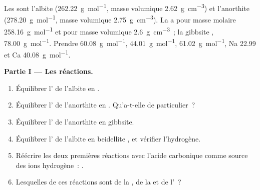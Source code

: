 \begin{problem}
\label{pb:b1:weathering-clays:1}
Les  sont l'albite  (\qty{262.22}{g.mol^{-1}}, masse volumique
\qty{2.62}{g.cm^{-3}}) et l'anorthite 
(\qty{278.20}{g.mol^{-1}}, masse volumique \qty{2.75}{g.cm^{-3}}). La 
 a pour masse molaire \qty{258.16}{g.mol^{-1}} et pour masse volumique
\qty{2.6}{g.cm^{-3}}~; la gibbsite , \qty{78.00}{g.mol^{-1}}. Prendre
 \qty{60.08}{g.mol^{-1}},  \qty{44.01}{g.mol^{-1}}, 
\qty{61.02}{g.mol^{-1}}, Na \num{22.99} et Ca \qty{40.08}{g.mol^{-1}}.

\medskip
\noindent\textbf{Partie I --- Les réactions.}
\begin{enumerate}
  \item Équilibrer l' de l'albite en .
  \item Équilibrer l' de l'anorthite en . Qu'a-t-elle de
        particulier~?
  \item Équilibrer l' de l'anorthite en gibbsite.
  \item Équilibrer l' de l'albite en beidellite
        , et vérifier l'hydrogène.
  \item Réécrire les deux premières réactions avec l'acide carbonique comme source
        des ions hydrogène~: .
  \item Lesquelles de ces réactions sont de la , de la  et
        de l'~?
\end{enumerate}


\end{problem}
